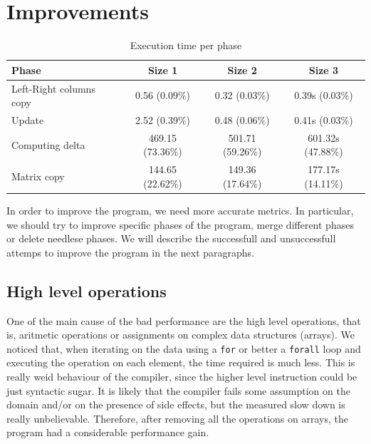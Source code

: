 \documentclass{article}
\begin{document}
\section{Improvements} \label{sec:improvements}

\begin{table}
\centering
\begin{tabular}{|l|c|c|c|}
\hline
Phase & Size 1 & Size 2 & Size 3 \\
\hline
Left-Right columns copy & 0.56 (0.09\%) & 0.32 (0.03\%) & 0.39s (0.03\%) \\
\hline
Update & 2.52 (0.39\%) & 0.48 (0.06\%) & 0.41s (0.03\%) \\
\hline
Computing delta & 469.15 (73.36\%) & 501.71 (59.26\%) & 601.32s (47.88\%) \\
\hline
Matrix copy & 144.65 (22.62\%) & 149.36 (17.64\%) & 177.17s (14.11\%) \\
\hline
\end{tabular}
\caption{Execution time per phase} \label{tab:timeperphasecomparison}
\end{table}

In order to improve the program, we need more accurate metrics. In particular, we should try to improve specific phases of the program, merge different phases or delete needlese phases. We will describe the successfull and unsuccessfull attemps to improve the program in the next paragraphs.

\subsection{High level operations}
One of the main cause of the bad performance are the high level operations, that is, aritmetic operations or assignments on complex data structures (arrays). We noticed that, when iterating on the data using a \texttt{for} or better a \texttt{forall} loop and executing the operation on each element, the time required is much less. This is really weid behaviour of the compiler, since the higher level instruction could be just syntactic sugar. It is likely that the compiler fails some assumption on the domain and/or on the presence of side effects, but the measured slow down is really unbelievable. Therefore, after removing all the operations on arrays, the program had a considerable performance gain.
\end{document}
